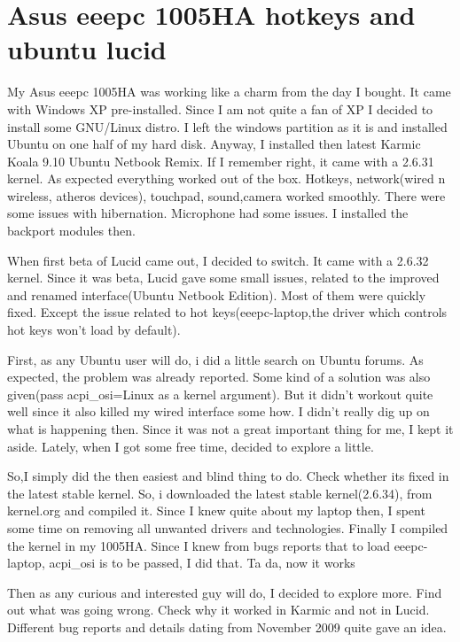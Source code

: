 \section*{Asus eeepc 1005HA hotkeys and ubuntu lucid}
\vskip 2pt

My Asus eeepc 1005HA was working like a charm from the day I bought. 
It came with Windows XP pre-installed. Since I am not quite a fan of XP I 
decided to install some GNU/Linux distro. I left the windows partition as 
it is and installed Ubuntu on one half of my hard disk. Anyway, I installed 
then latest Karmic Koala 9.10 Ubuntu Netbook Remix. If I remember right, it 
came with a 2.6.31 kernel. As expected everything worked out of the box. 
Hotkeys, network(wired n wireless, atheros devices), touchpad, sound,camera 
worked smoothly. There were some issues with hibernation. Microphone had some issues.
I installed the backport modules then.

When first beta of Lucid came out, I decided to switch. It came with a 2.6.32 kernel.
Since it was beta, Lucid gave some small issues, related to the improved and renamed 
interface(Ubuntu Netbook Edition). Most of them were quickly fixed. Except the issue
related to hot keys(eeepc-laptop,the driver which controls hot keys won’t load by default).

First, as any Ubuntu user will do, i did a little search on Ubuntu forums. As expected, 
the problem was already reported. Some kind of a solution was also given(pass acpi\_osi=Linux
as a kernel argument). But it didn’t workout quite well since it also killed my wired interface 
some how. I didn’t really dig up on what is happening then. Since it was not a great important thing
for me, I kept it aside. Lately, when I got some free time, decided to explore a little.

So,I simply did the then easiest and blind thing to do. 
Check whether its fixed in the latest stable kernel. So,
i downloaded the latest stable kernel(2.6.34), from kernel.org 
and compiled it. Since I knew quite about my laptop then, 
I spent some time on removing all unwanted drivers and technologies.
Finally I compiled the kernel in my 1005HA. Since I knew from bugs
reports that to load eeepc-laptop, acpi\_osi is to be passed, I did that. Ta da, now it works 

Then as any curious and interested guy will do, I decided to explore more. 
Find out what was going wrong. Check why it worked in Karmic and not in Lucid.
Different bug reports and details dating from November 2009 quite gave an idea.


